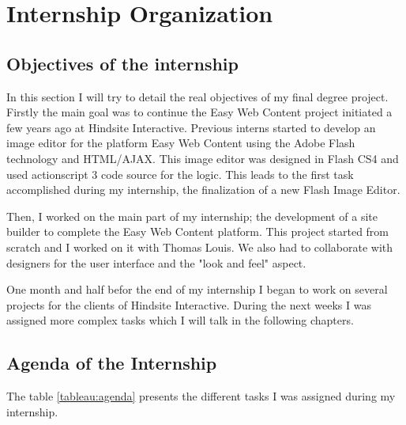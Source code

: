 \chapter{Internship Organization}

\section{Objectives of the internship}

In this section I will try to detail the real objectives of my final degree project.
Firstly the main goal was to continue the Easy Web Content project
initiated a few years ago at Hindsite Interactive.
Previous interns started to develop an image editor for the platform Easy Web Content using the Adobe
Flash technology and HTML/AJAX. This image editor was designed in Flash CS4 and used actionscript 3 code source for the logic.
This leads to the first task accomplished during my internship, the finalization
 of a new Flash Image Editor.
 
 Then, I worked on the main part of my internship; the development of a site builder to complete the Easy Web Content platform. This project started from scratch and I worked on it with Thomas Louis. We also had to collaborate with designers for the user interface and the "look and feel" aspect.

One month and half befor the end of my internship I began to work on several projects for the clients of Hindsite Interactive. During the next weeks I was assigned more complex tasks which I will talk in the following chapters.

\section{Agenda of the Internship}

The table \ref{tableau:agenda} presents the different tasks I was assigned during my internship.


